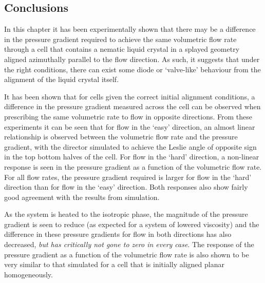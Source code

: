 \subsection{Conclusions}
In this chapter it has been experimentally shown that there may be a difference in the pressure gradient required to achieve the same volumetric flow rate through a cell that contains a nematic liquid crystal in a splayed geometry aligned azimuthally parallel to the flow direction. As such, it suggests that under the right conditions, there can exist some diode or `valve-like' behaviour from the alignment of the liquid crystal itself.

It has been shown that for cells given the correct initial alignment conditions, a difference in the pressure gradient measured across the cell can be observed when prescribing the same volumetric rate to flow in opposite directions. From these experiments it can be seen that for flow in the `easy' direction, an almost linear relationship is observed between the volumetric flow rate and the pressure gradient, with the director simulated to achieve the Leslie angle of opposite sign in the top bottom halves of the cell. For flow in the `hard' direction, a non-linear response is seen in the pressure gradient as a function of the volumetric flow rate. For all flow rates, the pressure gradient required is larger for flow in the `hard' direction than for flow in the `easy' direction. Both responses also show fairly good agreement with the results from simulation.

As the system is heated to the isotropic phase, the magnitude of the pressure gradient is seen to reduce (as expected for a system of lowered viscosity) and the difference in these pressure gradients for flow in both directions has also decreased, \textit{but has critically not gone to zero in every case}. The response of the pressure gradient as a function of the volumetric flow rate is also shown to be very similar to that simulated for a cell that is initially aligned planar homogeneously.

